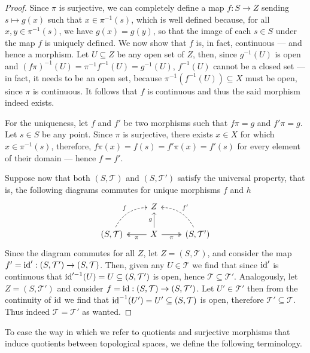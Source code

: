 \begin{proof}
Since \(\pi\) is surjective, we can completely define a map \(f: S \to Z\)
sending \(s \mapsto g(x)\) such that \(x \in \pi^{-1}(s)\), which is well
defined because, for all \(x, y \in \pi^{-1}(s)\), we have \(g(x) = g(y)\), so
that the image of each \(s \in S\) under the map \(f\) is uniquely defined. We
now show that \(f\) is, in fact, continuous --- and hence a morphism. Let \(U
\subseteq Z\) be any open set of \(Z\), then, since \(g^{-1}(U)\) is open and
\((f \pi)^{-1}(U) = \pi^{-1} f^{-1}(U) = g^{-1}(U)\), \(f^{-1}(U)\) cannot be a
closed set --- in fact, it needs to be an open set, because
\(\pi^{-1}(f^{-1}(U)) \subseteq X\) must be open, since \(\pi\) is continuous.
It follows that \(f\) is continuous and thus the said morphism indeed exists.

For the uniqueness, let \(f\) and \(f'\) be two morphisms such that \(f\pi = g\)
and \(f'\pi = g\). Let \(s \in S\) be any point. Since \(\pi\) is surjective,
there exists \(x \in X\) for which \(x \in \pi^{-1}(s)\), therefore, \(f \pi(x)
= f(s) = f'\pi(x) = f'(s)\) for every element of their domain --- hence \(f =
f'\).

Suppose now that both \((S, \mathcal T)\) and \((S, \mathcal T')\) satisfy the
universal property, that is, the following diagrams commutes for unique
morphisms \(f\) and \(h\)
\[
  \begin{tikzcd}
    &Z & \\
    (S, \mathcal T) \ar[ur, dashed, bend left, "f"]
    &X \ar[l, two heads, "\pi"] \ar[r, swap, two heads, "\pi"] \ar[u, "g"]
    &(S, \mathcal T') \ar[ul, dashed, bend right, swap, "f'"]
  \end{tikzcd}
\]
Since the diagram commutes for all \(Z\), let \(Z = (S, \mathcal T)\), and
consider the map \(f' = \operatorname{id}': (S, \mathcal T') \to (S, \mathcal T)\). Then,
given any \(U \in \mathcal T\) we find that since \(\operatorname{id}'\) is continuous that
\(\operatorname{id}'^{-1}(U) = U \subseteq (S, \mathcal T')\) is open, hence \(\mathcal T
\subseteq \mathcal T'\). Analogously, let \(Z = (S, \mathcal T')\) and consider
\(f = \operatorname{id}: (S, \mathcal T) \to (S, \mathcal T')\). Let \(U' \in \mathcal T'\)
then from the continuity of \(\operatorname{id}\) we find that \(\operatorname{id}^{-1}(U') = U' \subseteq
(S, \mathcal T)\) is open, therefore \(\mathcal T' \subseteq \mathcal T\). Thus
indeed \(\mathcal T = \mathcal T'\) as wanted.
\end{proof}

To ease the way in which we refer to quotients and surjective morphisms that
induce quotients between topological spaces, we define the following terminology.

